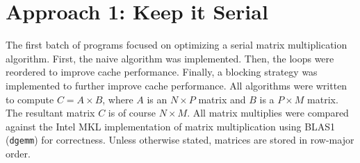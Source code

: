 \documentclass{article}
\begin{document}
\section{Approach 1: Keep it Serial}
The first batch of programs focused on optimizing a serial matrix multiplication algorithm.
First, the naive algorithm was implemented. Then, the loops were reordered to improve cache performance.
Finally, a blocking strategy was implemented to further improve cache performance. All 
algorithms were written to compute $C = A \times B$, where $A$ is an $N \times P$ 
matrix and $B$ is a $P \times M$ matrix. The resultant matrix $C$ is of course $N \times M$. 
All matrix multiplies were compared against the Intel MKL implementation of matrix multiplication using BLAS1
(\texttt{dgemm}) for correctness. Unless otherwise stated, matrices are stored in row-major order.
\end{document}
